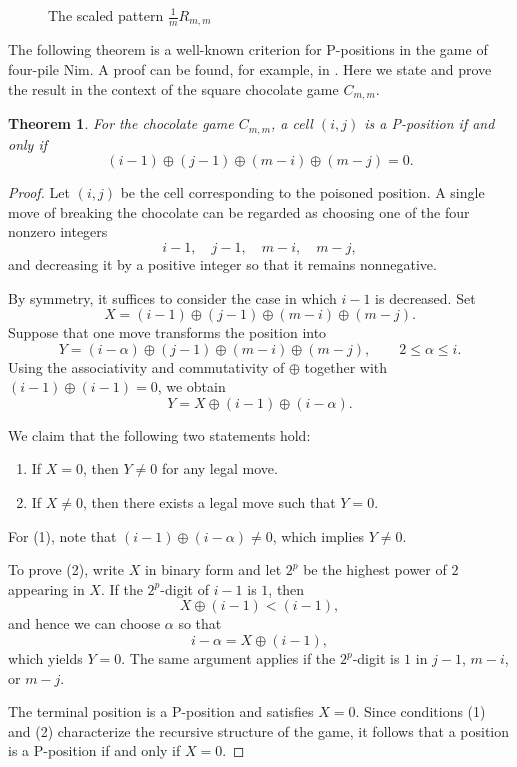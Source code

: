\documentclass{article}
\theoremstyle{definition}
\theoremstyle{plain}
\newtheorem{theorem}[definition]{Theorem}
\theoremstyle{remark}
\begin{document}
\begin{figure}[htbp]
\centering

\caption{The scaled pattern $\frac{1}{m}R_{m,m}$}
\label{fig:pattern}
\end{figure}

The following theorem is a well-known criterion for P-positions in the game of
four-pile Nim.
A proof can be found, for example, in \cite{Sato2014}.
Here we state and prove the result in the context of the square chocolate game $C_{m,m}$.

\begin{theorem}
\label{thm:nim}
For the chocolate game $C_{m,m}$, a cell $(i,j)$ is a P-position if and only if
\[
(i-1)\oplus(j-1)\oplus(m-i)\oplus(m-j)=0.
\]
\end{theorem}

\begin{proof}
Let $(i,j)$ be the cell corresponding to the poisoned position.
A single move of breaking the chocolate can be regarded as choosing one of the
four nonzero integers
\[
i-1,\quad j-1,\quad m-i,\quad m-j,
\]
and decreasing it by a positive integer so that it remains nonnegative.

By symmetry, it suffices to consider the case in which $i-1$ is decreased.
Set
\[
X=(i-1)\oplus(j-1)\oplus(m-i)\oplus(m-j).
\]
Suppose that one move transforms the position into
\[
Y=(i-\alpha)\oplus(j-1)\oplus(m-i)\oplus(m-j),
\qquad 2\le \alpha\le i.
\]
Using the associativity and commutativity of $\oplus$ together with
$(i-1)\oplus(i-1)=0$, we obtain
\[
Y=X\oplus(i-1)\oplus(i-\alpha).
\]

We claim that the following two statements hold:
\begin{enumerate}
\item If $X=0$, then $Y\neq0$ for any legal move.
\item If $X\neq0$, then there exists a legal move such that $Y=0$.
\end{enumerate}

For (1), note that $(i-1)\oplus(i-\alpha)\neq0$, which implies $Y\neq0$.

To prove (2), write $X$ in binary form and let $2^p$ be the highest power of $2$
appearing in $X$.
If the $2^p$-digit of $i-1$ is $1$, then
\[
X\oplus(i-1)<(i-1),
\]
and hence we can choose $\alpha$ so that
\[
i-\alpha = X\oplus(i-1),
\]
which yields $Y=0$.
The same argument applies if the $2^p$-digit is $1$ in $j-1$, $m-i$, or $m-j$.

The terminal position is a P-position and satisfies $X=0$. Since conditions (1) and (2) characterize the recursive structure of the game, it follows that a position is a P-position if and only if $X=0$. 
\end{proof}
\end{document}
